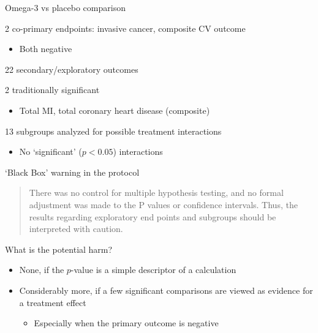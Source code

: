 \documentclass[ignorenonframetext,]{beamer}
\providecommand{\tightlist}{%
  \setlength{\itemsep}{0pt}\setlength{\parskip}{0pt}}
\begin{document}
\begin{frame}{Omega-3 vs placebo comparison}
\protect\hypertarget{omega-3-vs-placebo-comparison}{}

2 co-primary endpoints: invasive cancer, composite CV outcome

\begin{itemize}
\tightlist
\item
  Both negative
\end{itemize}

22 secondary/exploratory outcomes

2 traditionally significant

\begin{itemize}
\tightlist
\item
  Total MI, total coronary heart disease (composite)
\end{itemize}

13 subgroups analyzed for possible treatment interactions

\begin{itemize}
\tightlist
\item
  No `significant' (\(p < 0.05\)) interactions
\end{itemize}

\end{frame}

\begin{frame}{`Black Box' warning in the protocol}
\protect\hypertarget{black-box-warning-in-the-protocol}{}

\begin{quote}

There was no control for multiple hypothesis testing, and no formal adjustment was made to the P values or confidence intervals. Thus, the results regarding exploratory end points and subgroups should be interpreted with caution. 

\end{quote}

What is the potential harm?

\begin{itemize}
\item
  None, if the \(p\)-value is a simple descriptor of a calculation
\item
  Considerably more, if a few significant comparisons are viewed as
  evidence for a treatment effect

  \begin{itemize}
  \tightlist
  \item
    Especially when the primary outcome is negative
  \end{itemize}
\end{itemize}

\end{frame}
\end{document}
